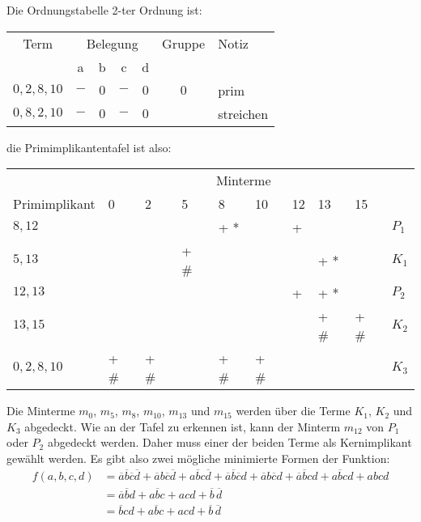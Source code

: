 \begin{center}
Die Ordnungstabelle 2-ter Ordnung ist:

\begin{tabular}{c *{4}{c} c l}
	Term       & \multicolumn{4}{c}{Belegung} & Gruppe & Notiz \\
	~          & a   & b   & c   & d   & ~    & ~              \\ \hline
	$0,2,8,10$ & $-$ & $0$ & $-$ & $0$ & $0$  & prim           \\
	$0,8,2,10$ & $-$ & $0$ & $-$ & $0$ & ~    & streichen      \\
\end{tabular}
\end{center}

\begin{center}
die Primimplikantentafel ist also:
\begin{tabular}{l|*{8}{l|}l}
                & \multicolumn{8}{c|}{Minterme}                       & ~     \\
  Primimplikant & 0    & 2    & 5    & 8    & 10   & 12 & 13   & 15   & ~     \\ \hline
  $8,12$        & ~    & ~    & ~    & + *  & ~    & +  & ~    & ~    & $P_1$ \\
  $5,13$        & ~    & ~    & + \# & ~    & ~    & ~  & + *  & ~    & $K_1$ \\
  $12,13$       & ~    & ~    & ~    & ~    & ~    & +  & + *  & ~    & $P_2$ \\
  $13,15$       & ~    & ~    & ~    & ~    & ~    & ~  & + \# & + \# & $K_2$ \\
  $0,2,8,10$    & + \# & + \# & ~    & + \# & + \# & ~  & ~    & ~    & $K_3$ \\
\end{tabular}
\end{center}
Die Minterme $m_0$, $m_5$, $m_8$, $m_{10}$, $m_{13}$ und $m_{15}$ werden über die Terme $K_1$, $K_2$ und $K_3$ abgedeckt. Wie an der Tafel zu erkennen ist, kann der Minterm $m_{12}$ von $P_1$ oder $P_2$ abgedeckt werden. Daher muss einer der beiden Terme als Kernimplikant gewählt werden. Es gibt also zwei mögliche minimierte Formen der Funktion:
\begin{align*}
	f(a,b,c,d) &= \overline{a}\overline{b}\overline{c}\overline{d} + \overline{a}b\overline{c}\overline{d} 
	              + a\overline{b}c\overline{d} + \overline{a}\overline{b}\overline{c}d + \overline{a}b\overline{c}d 
	              + \overline{a}\overline{b}cd + a\overline{b}cd + abcd \\
	           &= \overline{a}\overline{b}d + a\overline{b}c + acd + \overline{b}\hspace{2pt}\overline{d} \\
	           &= \overline{b}cd + a\overline{b}c + acd + \overline{b}\hspace{2pt}\overline{d} \\
\end{align*}








